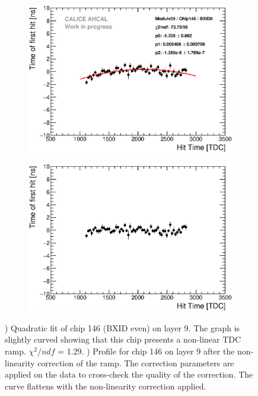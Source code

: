 \begin{figure}[htbp!]
	\begin{subfigure}[t]{0.49\textwidth}
		\centering
		\includegraphics[width=1\textwidth]{../Thesis_Plots/Timing/Muons/Plots/LinearityCorrection_Module09_Chip146_BXID0.eps}
		\caption{}\label{fig:LinCorr}
	\end{subfigure}
	\hfill
	\begin{subfigure}[t]{0.49\textwidth}
		\centering
		\includegraphics[width=1\textwidth]{../Thesis_Plots/Timing/Muons/Plots/LinearityCorrection_Module09_Chip146_BXID0_Corrected.eps}
		\caption{}\label{fig:LinCorr_2}
	\end{subfigure}
	\caption{) Quadratic fit of chip 146 (BXID even) on layer 9. The graph is slightly curved showing that this chip presents a non-linear TDC ramp. $\chi^2/ndf$ = 1.29. ) Profile for chip 146 on layer 9 after the non-linearity correction of the ramp. The correction parameters are applied on the data to cross-check the quality of the correction. The curve flattens with the non-linearity correction applied.}
\end{figure}

